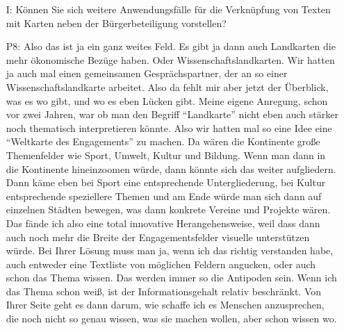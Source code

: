 \begin{itemize}
    \item[I:] K{\"o}nnen Sie sich weitere Anwendungsf{\"a}lle f{\"u}r die Verkn{\"u}pfung von Texten mit Karten neben der B{\"u}rgerbeteiligung vorstellen?
    \item[P8:] Also das ist ja ein ganz weites Feld. Es gibt ja dann auch Landkarten die mehr {\"o}konomische Bez{\"u}ge haben. Oder Wissenschaftslandkarten. Wir hatten ja auch mal einen gemeinsamen Gespr{\"a}chspartner, der an so einer Wissenschaftslandkarte arbeitet. Also da fehlt mir aber jetzt der {\"U}berblick, was es wo gibt, und wo es eben L{\"u}cken gibt. Meine eigene Anregung, schon vor zwei Jahren, war ob man den Begriff "`Landkarte"' nicht eben auch st{\"a}rker noch thematisch interpretieren k{\"o}nnte. Also wir hatten mal so eine Idee eine "`Weltkarte des Engagements"' zu machen. Da w{\"a}ren die Kontinente gro{\ss}e Themenfelder wie Sport, Umwelt, Kultur und Bildung. Wenn man dann in die Kontinente hineinzoomen w{\"u}rde, dann k{\"o}nnte sich das weiter aufgliedern. Dann k{\"a}me eben bei Sport eine entsprechende Untergliederung, bei Kultur entsprechende speziellere Themen und am Ende w{\"u}rde man sich dann auf einzelnen St{\"a}dten bewegen, was dann konkrete Vereine und Projekte w{\"a}ren. Das f{\"a}nde ich also eine total innovative Herangehensweise, weil dass dann auch noch mehr die Breite der Engagementsfelder visuelle unterst{\"u}tzen w{\"u}rde. Bei Ihrer L{\"o}sung muss man ja, wenn ich das richtig verstanden habe, auch entweder eine Textliste von m{\"o}glichen Feldern angucken, oder auch schon das Thema wissen. Das werden immer so die Antipoden sein. Wenn ich das Thema schon wei{\ss}, ist der Informationsgehalt relativ beschr{\"a}nkt. Von Ihrer Seite geht es dann darum, wie schaffe ich es Menschen anzusprechen, die noch nicht so genau wissen, was sie machen wollen, aber schon wissen wo. 
\end{itemize}

